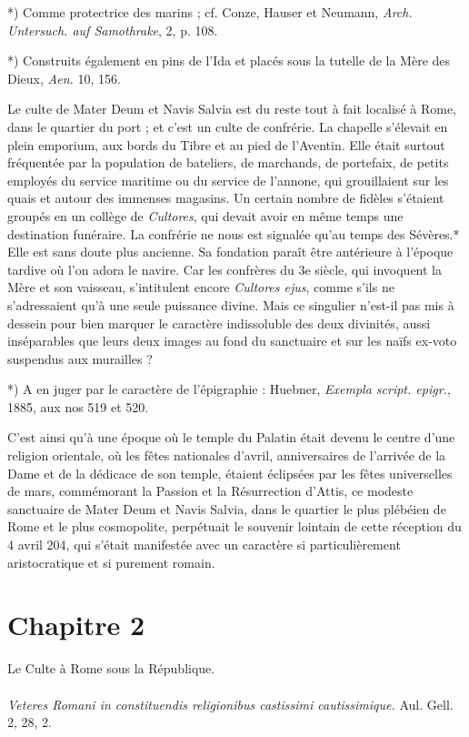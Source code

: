 \documentclass[a4paper, 11pt, oneside, polutonikogreek, french]{article}
\begin{document}
*) Comme protectrice des marins ; cf. Conze, Hauser et Neumann, \emph{Arch. Untersuch. auf Samothrake}, 2, p. 108.

*) Construits également en pins de l'Ida et placés sous la tutelle de la Mère des Dieux, \emph{Aen.} 10, 156.

Le culte de Mater Deum et Navis Salvia est du reste tout à fait localisé à Rome, dans le quartier du port ; et c'est un culte de confrérie. La chapelle s'élevait en plein emporium, aux bords du Tibre et au pied de l'Aventin. Elle était surtout fréquentée par la population de bateliers, de marchands, de portefaix, de petits employés du service maritime ou du service de l'annone, qui grouillaient sur les quais et autour des immenses magasins. Un certain nombre de fidèles s'étaient groupés en un collège de \emph{Cultores}, qui devait avoir en même temps une destination funéraire. La confrérie ne nous est signalée qu'au temps des Sévères.* Elle est sans doute plus ancienne. Sa fondation paraît être antérieure à l'époque tardive où l'on adora le navire. Car les confrères du 3e siècle, qui invoquent la Mère et son vaisseau, s'intitulent encore \emph{Cultores ejus}, comme s'ils ne s'adressaient qu'à une seule puissance divine. Mais ce singulier n'est-il pas mis à dessein pour bien marquer le caractère indissoluble des deux divinités, aussi inséparables que leurs deux images au fond du sanctuaire et sur les naïfs ex-voto suspendus aux murailles ?

*) A en juger par le caractère de l'épigraphie : Huebner, \emph{Exempla script. epigr.}, 1885, aux nos 519 et 520.

C'est ainsi qu'à une époque où le temple du Palatin était devenu le centre d'une religion orientale, où les fêtes nationales d'avril, anniversaires de l'arrivée de la Dame et de la dédicace de son temple, étaient éclipsées par les fêtes universelles de mars, commémorant la Passion et la Résurrection d'Attis, ce modeste sanctuaire de Mater Deum et Navis Salvia, dans le quartier le plus plébéien de Rome et le plus cosmopolite, perpétuait le souvenir lointain de cette réception du 4 avril 204, qui s'était manifestée avec un caractère si particulièrement aristocratique et si purement romain.
\clearpage
\section{Chapitre 2}
\begin{center}
Le Culte à Rome sous la République.
\end{center}
\paragraph{}
\emph{Veteres Romani in constituendis religionibus castissimi cautissimique.} Aul. Gell. 2, 28, 2.
\end{document}
